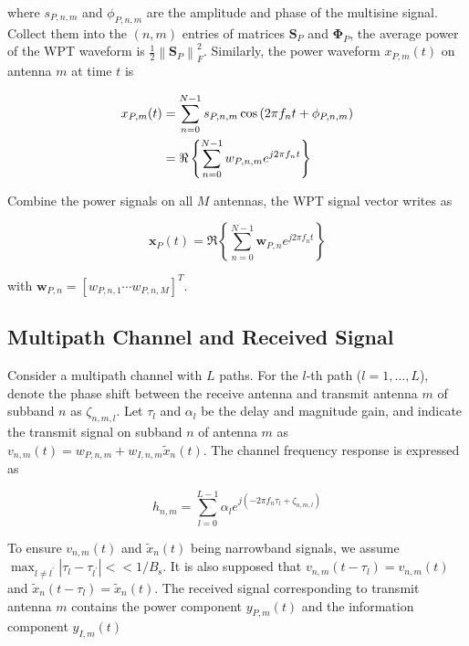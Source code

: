 where ${s_{P,n,m}}$ and ${{\phi _{P,n,m}}}$ are the amplitude and phase of the multisine signal. Collect them into the $(n,m)$ entries of matrices ${{\mathbf{S}}_P}$ and ${{\mathbf{\Phi }}_P}$, the average power of the WPT waveform is $\frac{1}{2}\left\|\mathbf{S}_{P}\right\|_{F}^{2}$. Similarly, the power waveform ${x_{P,m}}(t)$ on antenna $m$ at time $t$ is

\begin{align}\label{eqn:power_waveform}
  {x_{P,m}}(t) &= \sum\limits_{n = 0}^{N - 1} {{s_{P,n,m}}\cos \left( {2\pi {f_n}t + {\phi _{P,n,m}}} \right)}  \hfill \\
   &= \Re \left\{ {\sum\limits_{n = 0}^{N - 1} {{w_{P,n,m}}{e^{j2\pi {f_n}t}}} } \right\} \hfill
\end{align}

Combine the power signals on all $M$ antennas, the WPT signal vector writes as

\begin{equation}\label{eqn:wpt_vector}
  {{\mathbf{x}}_P}(t) = \Re \left\{ {\sum\limits_{n = 0}^{N - 1} {{{\mathbf{w}}_{P,n}}} {e^{j2\pi {f_n}t}}} \right\}
\end{equation}

with ${{\mathbf{w}}_{P,n}} = {\left[ {{w_{P,n,1}} \cdots {w_{P,n,M}}} \right]^T}$.

\subsection{Multipath Channel and Received Signal}
Consider a multipath channel with $L$ paths. For the $l$-th path ($l = 1, \ldots ,L$), denote the phase shift between the receive antenna and transmit antenna $m$ of subband $n$ as ${\zeta _{n,m,l}}$. Let ${\tau _l}$ and ${\alpha _l}$ be the delay and magnitude gain, and indicate the transmit signal on subband $n$ of antenna $m$ as ${v_{n,m}}(t) = {w_{P,n,m}} + {w_{I,n,m}}{{\tilde x}_n}(t)$. The channel frequency response is expressed as

\begin{equation}\label{eqn:channel}
  {h_{n,m}} = \sum\limits_{l = 0}^{L - 1} {{\alpha _l}{e^{j\left( { - 2\pi {f_n}{\tau _l} + {\zeta _{n,m,l}}} \right)}}}
\end{equation}

To ensure $v_{n, m}(t)$ and $\tilde{x}_{n}(t)$ being narrowband signals, we assume ${\max _{l \ne {l^\prime }}}\left| {{\tau _l} - {\tau _{{l^\prime }}}} \right| <  < 1/{B_{\text{s}}}$. It is also supposed that ${v_{n,m}}\left( {t - {\tau _l}} \right) = {v_{n,m}}(t)$ and ${{\tilde x}_n}\left( {t - {\tau _l}} \right) = {{\tilde x}_n}(t)$. The received signal corresponding to transmit antenna $m$ contains the power component $y_{P, m}(t)$ and the information component $y_{I, m}(t)$


